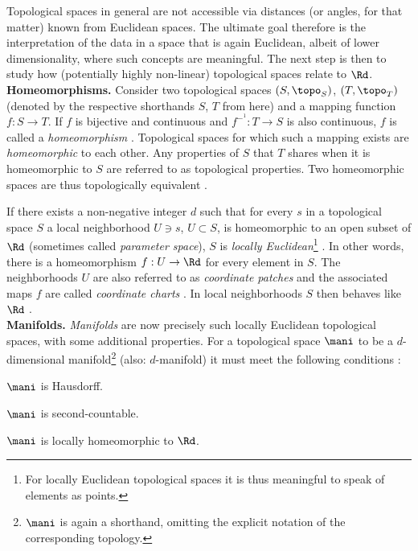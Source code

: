 Topological spaces in general are not accessible via distances (or angles, for 
that matter) known from Euclidean spaces.
The ultimate goal therefore is the interpretation of the data in a space that is 
again Euclidean, albeit of lower dimensionality, where such concepts are 
meaningful.
The next step is then to study how (potentially highly non-linear) topological 
spaces relate to $\Rd$.
\\

\textbf{Homeomorphisms.} Consider two topological spaces $(S, \topo_S)$, 
$(T, \topo_T)$ (denoted by the respective shorthands $S$, $T$ from here) and a 
mapping function $f: S \rightarrow T$. 
If $f$ is bijective and continuous and $f^{-^1}: T \rightarrow S$ is also 
continuous, $f$ is called a \textit{homeomorphism} \citep{brown2006}.
Topological spaces for which such a mapping exists are \textit{homeomorphic} to
each other. 
Any properties of $S$ that $T$ shares when it is homeomorphic to $S$ are 
referred to as topological properties. 
Two homeomorphic spaces are thus topologically equivalent \citep{mccleary2006}.

If there exists a non-negative integer $d$ such that for every $s$ in a 
topological space $S$ a local neighborhood $U \ni s$, $U \subset S$, is 
homeomorphic to an open subset of $\Rd$ (sometimes called \textit{parameter 
space}), $S$ is \textit{locally 
Euclidean}\footnote{
For locally Euclidean topological spaces it is thus meaningful to speak of
elements as points.
} \citep{mafu2011}.
In other words, there is a homeomorphism $f: U \rightarrow \Rd$ for every 
element in $S$.
The neighborhoods $U$ are also referred to as  \textit{coordinate patches} and 
the associated maps $f$ are called \textit{coordinate charts} 
\citep{cayton2005}.
In local neighborhoods $S$ then behaves like $\Rd$ \citep{mafu2011}.
\\

\textbf{Manifolds.} \textit{Manifolds} are now precisely such locally Euclidean
topological spaces, with some additional properties.
For a topological space $\mani$ to be a $d$-dimensional manifold\footnote{
$\mani$ is again a shorthand, omitting the explicit notation of the 
corresponding topology. 
} (also: $d$-manifold) it must meet 
the following conditions \citep{waldmann2014}:

\begin{tight_enumerate}
  \item $\mani$ is Hausdorff.
  \item $\mani$ is second-countable.
  \item $\mani$ is locally homeomorphic to $\Rd$.
\end{tight_enumerate}

